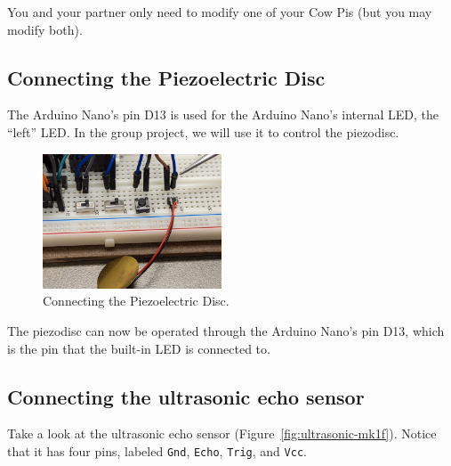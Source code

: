 You and your partner only need to modify one of your Cow Pis (but you may modify both).

\subsection{Connecting the Piezoelectric Disc}

The Arduino Nano's pin D13 is used for the Arduino Nano's internal LED, the ``left'' LED.
In the group project, we will use it to control the piezodisc.

\begin{description}
\end{description}

\begin{figure}
    \centering
    \includegraphics[height=4cm]{hardware/mk1f/adjust_piezo_wire}
    \caption{\label{fig:insertPiezo} Connecting the Piezoelectric Disc.}
\end{figure}

The piezodisc can now be operated through the Arduino Nano's pin D13, which is the pin that the built-in LED is connected to.


\subsection{Connecting the ultrasonic echo sensor}

Take a look at the ultrasonic echo sensor (Figure~\ref{fig:ultrasonic-mk1f}).
Notice that it has four pins, labeled \texttt{Gnd}, \texttt{Echo}, \texttt{Trig}, and \texttt{Vcc}.

